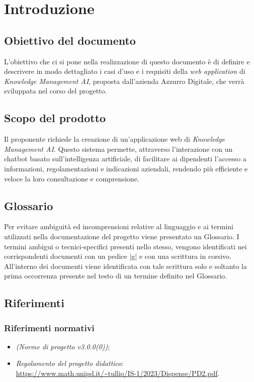 \documentclass[10pt, a4paper]{article}
\title{\titolo}
\author{SWEetCode}
\begin{document}



\newpage

\tableofcontents
\newpage

\listoffigures
\newpage

\listoftables
\newpage

\section{Introduzione}
\subsection{Obiettivo del documento}
L'obiettivo che ci si pone nella realizzazione di questo documento è di definire e descrivere in modo dettagliato i casi d'uso e i requisiti della \textit{web application} di \textit{Knowledge Management AI}, proposta dall'azienda Azzurro Digitale, che verrà sviluppata nel corso del progetto.
\subsection{Scopo del prodotto}
Il proponente richiede la creazione di un'applicazione web di \textit{Knowledge Management AI}. Questo sistema permette, attraverso l'interazione con un chatbot basato sull'intelligenza artificiale, di facilitare ai dipendenti l'accesso a informazioni, regolamentazioni e indicazioni aziendali, rendendo più efficiente e veloce la loro consultazione e comprensione.

\subsection{Glossario}
Per evitare ambiguità ed incomprensioni relative al linguaggio e ai termini utilizzati nella documentazione del progetto viene presentato un Glossario.
I termini ambigui o tecnici-specifici presenti nello stesso, vengono identificati nei corrispondenti documenti con un pedice |g| e con una scrittura in corsivo.
All'interno dei documenti viene identificata con tale scrittura solo e soltanto la prima occorrenza presente nel testo di un termine definito nel Glossario.

\subsection{Riferimenti}
\subsubsection{Riferimenti normativi}
\begin{itemize}
    \item \textit{(Norme di progetto v3.0.0(0))};
    \item \textit{Regolamento del progetto didattico}: \\
    \href{https://www.math.unipd.it/~tullio/IS-1/2023/Dispense/PD2.pdf}{https://www.math.unipd.it/\textasciitilde tullio/IS-1/2023/Dispense/PD2.pdf}.
\end{itemize}
\end{document}
